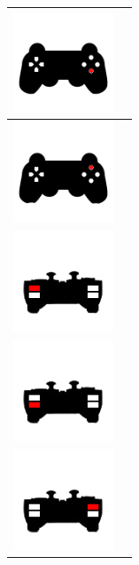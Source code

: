 \begin{table}[H]
  \begin{center}
    \begin{tabular}{|p{3cm}|p{8cm}|}
      \hline
       \includegraphics[width=3cm]{./imagenes/pad-7.png} & \vspace*{-.8in}{Incrementar velocidad. La velocidad de movimiento del vehículo aumenta.} \\
      \hline
       \includegraphics[width=3cm]{./imagenes/pad-5.png} & \vspace*{-.8in}{Sin función.} \\
      \hline
      \includegraphics[width=3cm]{./imagenes/pad-9.png} & \vspace*{-.8in}{Tomar fotografía. Realiza una captura de la imagen visualizada en pantalla.} \\
      \hline
      \includegraphics[width=3cm]{./imagenes/pad-10.png} & \vspace*{-.8in}{Sin función.} \\
      \hline
      \includegraphics[width=3cm]{./imagenes/pad-11.png} & \vspace*{-.8in}{Activación/desactivación de láseres. Los láseres son desactivados si se encuentran en estado encendido o activados si se encuentran en estado apagado.} \\

\end{tabular}
\end{center}
\end{table}
